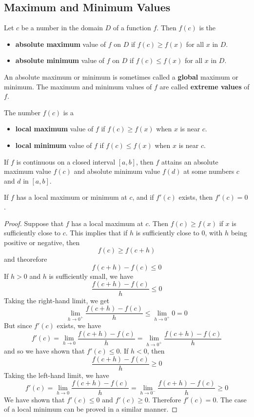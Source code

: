 \subsection{Maximum and Minimum Values}

\begin{definition}
    Let \(c\) be a number in the domain \(D\) of a function \(f\).
    Then \(f(c)\) is the
    \begin{itemize}
        \item \textbf{absolute maximum} value of \(f\) on \(D\) if
        \(f(c)\geq f(x)\) for all \(x\) in \(D\).
        \item \textbf{absolute minimum} value of \(f\) on \(D\) if
        \(f(c)\leq f(x)\) for all \(x\) in \(D\).
    \end{itemize}
\end{definition}
An absolute maximum or minimum is sometimes called a \textbf{global} maximum
or minimum.
The maximum and minimum values of \(f\) are called \textbf{extreme values} of
\(f\).
\begin{definition}
    The number \(f(c)\) is a
    \begin{itemize}
        \item \textbf{local maximum} value of \(f\) if \(f(c)\geq f(x)\) when
        \(x\) is near \(c\).
        \item \textbf{local minimum} value of \(f\) if \(f(c)\leq f(x)\) when
        \(x\) is near \(c\).
    \end{itemize}
\end{definition}
\begin{theorem}
    If \(f\) is continuous on a closed interval \([a,b]\), then \(f\) attains
    an absolute maximum value \(f(c)\) and absolute minimum value \(f(d)\) at
    some numbers \(c\) and \(d\) in \([a,b]\).
\end{theorem}
\begin{theorem}
    If \(f\) has a local maximum or minimum at \(c\), and if \(f'(c)\) exists,
    then \(f'(c)=0\).
\end{theorem}
\begin{proof}
    Suppose that \(f\) has a local maximum at \(c\).
    Then \(f(c)\geq f(x)\) if \(x\) is sufficiently close to \(c\).
    This implies that if \(h\) is sufficiently close to 0, with \(h\) being
    positive or negative, then
    \[f(c)\geq f(c+h)\]
    and theorefore
    \[f(c+h)-f(c)\leq 0\]
    If \(h>0\) and \(h\) is sufficiently small, we have
    \[\frac{f(c+h)-f(c)}{h}\leq 0\]
    Taking the right-hand limit, we get
    \[\lim_{h\to 0^+}\frac{f(c+h)-f(c)}{h}\leq\lim_{h\to 0^+}0=0\]
    But since \(f'(c)\) exists, we have
    \[f'(c)=\lim_{h\to 0}\frac{f(c+h)-f(c)}{h}
    =\lim_{h\to 0^+}\frac{f(c+h)-f(c)}{h}\]
    and so we have shown that \(f'(c)\leq 0\).
    If \(h<0\), then
    \[\frac{f(c+h)-f(c)}{h}\geq 0\]
    Taking the left-hand limit, we have
    \[f'(c)=\lim_{h\to 0}\frac{f(c+h)-f(c)}{h}
    =\lim_{h\to 0^-}\frac{f(c+h)-f(c)}{h}\geq 0\]
    We have shown that \(f'(c)\leq 0\) and \(f'(c)\geq 0\).
    Therefore \(f'(c)=0\).
    The case of a local minimum can be proved in a similar manner.
\end{proof}
